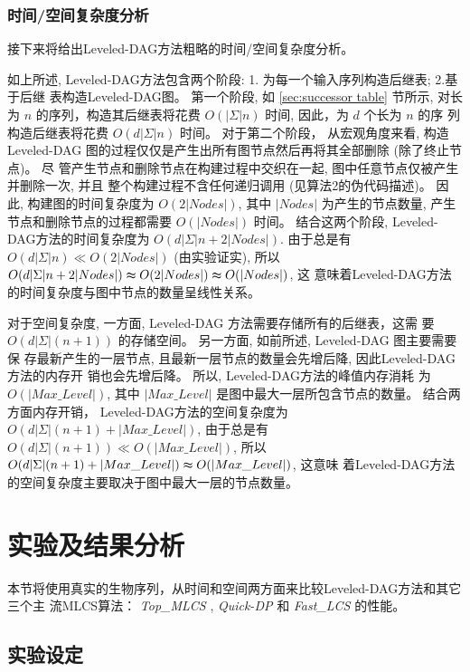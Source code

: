 \documentclass[utf8]{frontiersSCNS} %
\begin{document}
\subsubsection{时间/空间复杂度分析}
\label{sec:complexity}

接下来将给出Leveled-DAG方法粗略的时间/空间复杂度分析。

如上所述, Leveled-DAG方法包含两个阶段: 1. 为每一个输入序列构造后继表; 2.基于后继
表构造Leveled-DAG图。 第一个阶段, 如 \ref{sec:successor table} 节所示, 对长为
$n$ 的序列，构造其后继表将花费 $O(|\Sigma|n)$ 时间, 因此，为 $d$ 个长为 $n$ 的序
列构造后继表将花费 $O(d|\Sigma|n)$ 时间。 对于第二个阶段， 从宏观角度来看, 构造
Leveled-DAG 图的过程仅仅是产生出所有图节点然后再将其全部删除 (除了终止节点)。 尽
管产生节点和删除节点在构建过程中交织在一起, 图中任意节点仅被产生并删除一次, 并且
整个构建过程不含任何递归调用 (见算法2的伪代码描述)。 因此, 构建图的时间复杂度为
$O(2|Nodes|)$, 其中 $|Nodes|$ 为产生的节点数量, 产生节点和删除节点的过程都需要
$O(|Nodes|)$ 时间。 结合这两个阶段, Leveled-DAG方法的时间复杂度为 $O(d|\Sigma|n
+ 2|Nodes|)$. 由于总是有 $O(d|\Sigma|n) \ll O(2|Nodes|)$ (由实验证实), 所以
$O(d|\Sigma|n + 2|Nodes|) \thickapprox O(2|Nodes|) \thickapprox O(|Nodes|)$, 这
意味着Leveled-DAG方法的时间复杂度与图中节点的数量呈线性关系。

对于空间复杂度, 一方面, Leveled-DAG 方法需要存储所有的后继表，这需
要 $O(d|\Sigma|(n+1))$ 的存储空间。 另一方面, 如前所述, Leveled-DAG 图主要需要保
存最新产生的一层节点, 且最新一层节点的数量会先增后降, 因此Leveled-DAG方法的内存开
销也会先增后降。 所以, Leveled-DAG方法的峰值内存消耗
为 $O(|Max\_Level|)$, 其中 $|Max\_Level|$ 是图中最大一层所包含节点的数量。 结合两
方面内存开销， Leveled-DAG方法的空间复杂度为 $O(d|\Sigma|(n+1) + |Max\_Level|)$,
由于总是有 $O(d|\Sigma|(n+1)) \ll O(|Max\_Level|)$, 所以
$O(d|\Sigma|(n+1) + |Max\_Level|) \thickapprox O(|Max\_Level|)$, 这意味
着Leveled-DAG方法的空间复杂度主要取决于图中最大一层的节点数量。


\section{实验及结果分析}
\label{sec:experiments}

本节将使用真实的生物序列，从时间和空间两方面来比较Leveled-DAG方法和其它三个主
流MLCS算法： \emph{Top\_MLCS} \cite{Li2016_ICDE}, \emph{Quick-DP}
\cite{Wang2011} 和 \emph{Fast\_LCS} \cite{Chen2006} 的性能。

\subsection{实验设定}
\label{Test problems}
\end{document}
